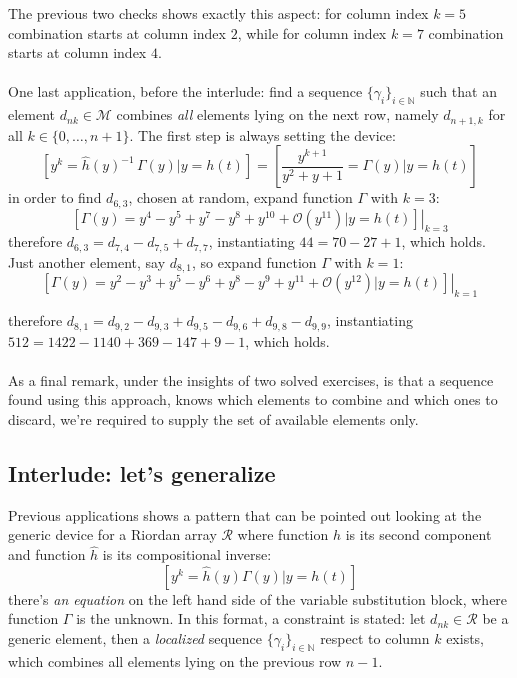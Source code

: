 The previous two checks shows exactly this aspect: for column index $k=5$
combination starts at column index $2$, while for column index $k=7$ combination
starts at column index $4$.
\\\\
One last application, before the interlude: 
find a sequence $\lbrace \gamma_{i} \rbrace_{i\in\mathbb{N}}$ such that 
an element $d_{nk}\in\mathcal{M}$ combines \emph{all} elements lying on 
the next row, namely $d_{n+1,k}$ for all $k\in\lbrace0,\ldots,n+1\rbrace$.
The first step is always setting the device:
\begin{displaymath}
    \left[y^{k} = \hat{h}(y)^{-1}\,\Gamma(y) \big| y = h(t) \right]=
        \left[ \frac{y^{k + 1}}{y^2 + y + 1} = \Gamma(y) \big| y = h(t) \right]
\end{displaymath}
in order to find $d_{6,3}$, chosen at random, expand function $\Gamma$ with $k=3$:
\begin{displaymath}
    \left.\left[\Gamma(y)=y^4 -y^5 + y^7 -y^8 +y^{10} + \mathcal{O}(y^{11}) 
        \big| y = h(t) \right]\right|_{k=3}
\end{displaymath}
therefore $d_{6,3}=d_{7,4} - d_{7,5} + d_{7,7}$, instantiating $44 = 70 -27 +1$, 
which holds. Just another element, say $d_{8,1}$, so expand function 
$\Gamma$ with $k=1$:
\begin{displaymath}
    \left.\left[\Gamma(y)=y^2 -y^3 + y^5 -y^6 + y^8 -y^9 + y^{11} + 
        \mathcal{O}(y^{12}) \big| y = h(t) \right]\right|_{k=1}
\end{displaymath}

therefore $d_{8,1}=d_{9,2} - d_{9,3} + d_{9,5}- d_{9,6}+ d_{9,8}- d_{9,9}$, 
instantiating $512 = 1422 -1140 +369 -147 +9 -1$, which holds.
\\\\
As a final remark, under the insights of two solved exercises, is that a
sequence found using this approach, knows which elements to combine and which
ones to discard, we're required to supply the set of available elements only.


\subsection{Interlude: let's generalize}
\label{subsec:sequences:interluce:generalization}

Previous applications shows a pattern that can be pointed out looking at 
the generic device for a Riordan array $\mathcal{R}$ where 
function $h$ is its second component and function $\hat{h}$ 
is its compositional inverse:
\begin{displaymath}
    \left[y^{k} = \hat{h}(y) \Gamma(y) \big| y = h(t) \right]
\end{displaymath}
there's \emph{an equation} on the left hand side of the variable substitution block, 
where function $\Gamma$ is the unknown. In this format, 
a constraint is stated: let $d_{nk}\in\mathcal{R}$ be a generic element, 
then a \emph{localized} sequence 
$\lbrace \gamma_{i} \rbrace_{i\in\mathbb{N}}$ respect to column $k$ exists, which
combines all elements lying on the previous row $n-1$.

